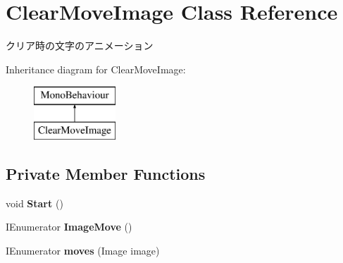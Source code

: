 \hypertarget{class_clear_move_image}{}\section{Clear\+Move\+Image Class Reference}
\label{class_clear_move_image}


クリア時の文字のアニメーション  


Inheritance diagram for Clear\+Move\+Image\+:\begin{figure}[H]
\begin{center}
\leavevmode
\includegraphics[height=2.000000cm]{class_clear_move_image}
\end{center}
\end{figure}
\subsection*{Private Member Functions}
\begin{DoxyCompactItemize}
\item 
\mbox{\label{class_clear_move_image_a17cb877087b9e0cb1ff68101aee0fc21}} 
void {\bfseries Start} ()
\item 
\mbox{\label{class_clear_move_image_a186935dd4675b1fd43f03a02b08555fe}} 
I\+Enumerator {\bfseries Image\+Move} ()
\item 
\mbox{\label{class_clear_move_image_a5c69c86b50aebfa280780da367900a77}} 
I\+Enumerator {\bfseries moves} (Image image)
\end{DoxyCompactItemize}
